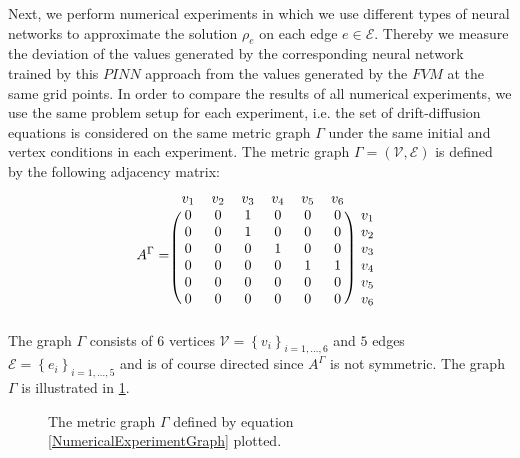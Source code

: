 Next, we perform numerical experiments in which we use different types of neural networks to approximate the solution $\rho_e$ on each edge $e \in \mathcal{E}$. Thereby we measure the deviation of the values generated by the corresponding neural network trained by this $PINN$ approach from the values generated by the $FVM$ at the same grid points. In order to compare the results of all numerical experiments, we use the same problem setup for each experiment, i.e. the set of drift-diffusion equations is considered on the same metric graph $\Gamma$ under the same initial and vertex conditions in each experiment. The metric graph $\Gamma = \left( \mathcal{V}, \mathcal{E} \right)$ is defined by the following adjacency matrix: 
\begin{equation}
    \label{NumericalExperimentGraph}
    A^{\Gamma} = 
    \begin{blockarray}{ccccccc}
        v_1 & v_2 & v_3 & v_4 & v_5 & v_6 \\
        \begin{block}{(cccccc)c}
            0 & 0 & 1 & 0 & 0 & 0 & v_1 \\
            0 & 0 & 1 & 0 & 0 & 0 & v_2 \\
            0 & 0 & 0 & 1 & 0 & 0 & v_3 \\
            0 & 0 & 0 & 0 & 1 & 1 & v_4 \\
            0 & 0 & 0 & 0 & 0 & 0 & v_5 \\
            0 & 0 & 0 & 0 & 0 & 0 & v_6 \\
        \end{block}
    \end{blockarray}
\end{equation}
The graph $\Gamma$ consists of $6$ vertices $\mathcal{V} = \left\{ v_i \right\}_{i = 1,\ldots, 6}$ and $5$ edges $\mathcal{E} = \left\{ e_i \right\}_{i = 1,\ldots, 5}$ and is of course directed since $A^{\Gamma}$ is not symmetric. The graph $\Gamma$ is illustrated in \cref{fig7}. 
\begin{figure}[H]
    \begin{center}
    \end{center}
    \caption{The metric graph $\Gamma$ defined by equation \cref{NumericalExperimentGraph} plotted.}
    \label{fig7}
\end{figure}
